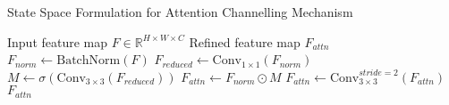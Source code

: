 \begin{algorithm}
\caption{State Space Formulation for Attention Channelling Mechanism}
\begin{algorithmic}[1]
\Require Input feature map $F \in \mathbb{R}^{H \times W \times C}$
\Ensure Refined feature map $F_{attn}$
    \State $F_{norm} \gets \text{BatchNorm}(F)$
    \State $F_{reduced} \gets \text{Conv}_{1\times1}(F_{norm})$
    \State $M \gets \sigma(\text{Conv}_{3\times3}(F_{reduced}))$
    \State $F_{attn} \gets F_{norm} \odot M$
        \State $F_{attn} \gets \text{Conv}_{3\times3}^{stride=2}(F_{attn})$
    \EndFor
    \State \Return $F_{attn}$
\EndFunction
\end{algorithmic}
\end{algorithm}
